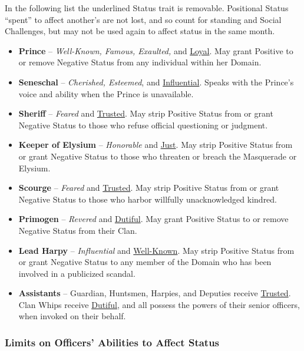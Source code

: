 In the following list the underlined Status trait is removable. Positional Status ``spent'' to 
affect another's are not lost, and so count for standing and Social Challenges, but may not be used 
again to affect status in the same month. \\

\begin{itemize}
   \item \textbf{Prince} -- \emph{Well-Known, Famous, Exaulted,} and \underline{Loyal}. May grant Positive to or remove Negative Status from any individual within her Domain.
   \item \textbf{Seneschal} -- \emph{Cherished, Esteemed}, and \underline{Influential}.  Speaks with the Prince's voice and ability when the Prince is unavailable. 
   \item \textbf{Sheriff} -- \emph{Feared} and \underline{Trusted}.  May strip Positive Status from or grant Negative Status to those who refuse official questioning or judgment.
   \item \textbf{Keeper of Elysium} -- \emph{Honorable} and \underline{Just}. May strip Positive Status from or grant Negative Status to those who threaten or breach the Masquerade or Elysium.
   \item \textbf{Scourge} -- \emph{Feared} and \underline{Trusted}.  May strip Positive Status from or grant Negative Status to those who harbor willfully unacknowledged kindred.
   \item \textbf{Primogen} -- \emph{Revered} and \underline{Dutiful}.  May grant Positive Status to or remove Negative Status from their Clan.
   \item \textbf{Lead Harpy} -- \emph{Influential} and \underline{Well-Known}.  May strip Positive Status from or grant Negative Status to any member of the Domain who has been involved in a publicized scandal.
   \item \textbf{Assistants} -- Guardian, Huntsmen, Harpies, and Deputies receive \underline{Trusted}. Clan Whips receive \underline{Dutiful}, and all possess the powers of their senior officers, when invoked on their behalf.
\end{itemize}

\subsubsection{Limits on Officers' Abilities to Affect Status}

